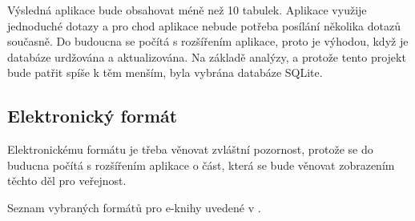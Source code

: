         Výsledná aplikace bude obsahovat méně než 10 tabulek. Aplikace využije jednoduché dotazy a pro chod aplikace nebude potřeba posílání několika dotazů současně. Do budoucna se počítá s rozšířením aplikace, proto je výhodou, když je databáze urdžována a aktualizována. Na základě analýzy, a protože tento projekt bude patřit spíše k těm menším, byla vybrána databáze SQLite.
        
        \subsection{Elektronický formát}
            \cite{electronic-format}
            
            Elektronickému formátu je třeba věnovat zvláštní pozornost, protože se do buducna počítá s rozšířením aplikace o část, která se bude věnovat zobrazením těchto děl pro veřejnost.
            
            Seznam vybraných formátů pro e-knihy uvedené v \cite{electronic-format}.
            
